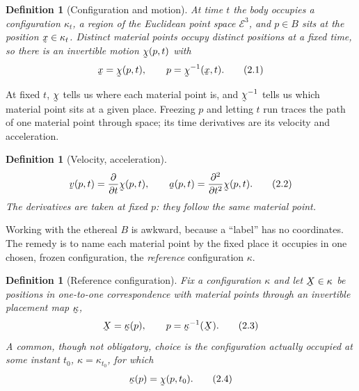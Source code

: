 \documentclass[17pt,a4paper]{extreport}
\DeclareRobustCommand{\vek}[1]{\underaccent{\tilde}{#1}}
\newcommand{\Et}{\mathcal{E}^{3}}          %
\newcommand{\ba}{\vek{a}}
\newcommand{\bv}{\vek{v}}
\newcommand{\bx}{\vek{x}}
\newcommand{\bX}{\vek{X}}
\newcommand{\bchi}{\vek{\chi}}
\newcommand{\bkappa}{\vek{\kappa}}
\theoremstyle{scplain}
\theoremstyle{scdefn}
\newtheorem{definition}[theorem]{Definition}
\begin{document}
\begin{definition}[Configuration and motion]\label{def:motion}
At time $t$ the body occupies a \emph{configuration} $\kappa_t$, a region of
the Euclidean point space $\Et$, and $p\in B$ sits at the position
$\bx\in\kappa_t$. Distinct material points occupy distinct positions at a
fixed time, so there is an invertible \emph{motion} $\bchi(p,t)$ with
\begin{equation}
   \bx=\bchi(p,t),\qquad p=\bchi^{-1}(\bx,t). \tag{2.1}\label{eq:2.1}
\end{equation}
\end{definition}

At fixed $t$, $\bchi$ tells us where each material point is, and
$\bchi^{-1}$ tells us which material point sits at a given place. Freezing
$p$ and letting $t$ run traces the path of one material point through
space; its time derivatives are its velocity and acceleration.

\begin{definition}[Velocity, acceleration]\label{def:va}
\begin{equation}
   \bv(p,t)=\frac{\partial}{\partial t}\bchi(p,t),\qquad
   \ba(p,t)=\frac{\partial^{2}}{\partial t^{2}}\bchi(p,t). \tag{2.2}\label{eq:2.2}
\end{equation}
The derivatives are taken at fixed $p$: they follow the \emph{same} material
point.
\end{definition}

Working with the ethereal $B$ is awkward, because a ``label'' has no
coordinates. The remedy is to name each material point by the fixed place
it occupies in one chosen, frozen configuration, the \emph{reference}
configuration $\kappa$.

\begin{definition}[Reference configuration]\label{def:ref}
Fix a configuration $\kappa$ and let $\bX\in\kappa$ be positions in one-to-one
correspondence with material points through an invertible placement map
$\bkappa$,
\begin{equation}
   \bX=\bkappa(p),\qquad p=\bkappa^{-1}(\bX). \tag{2.3}\label{eq:2.3}
\end{equation}
A common, though not obligatory, choice is the configuration actually
occupied at some instant $t_0$, $\kappa=\kappa_{t_0}$, for which
\begin{equation}
   \bkappa(p)=\bchi(p,t_0). \tag{2.4}\label{eq:2.4}
\end{equation}
\end{definition}
\end{document}
